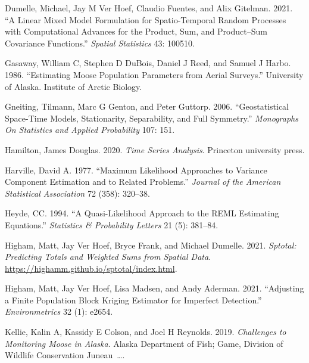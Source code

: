 \documentclass[smallextended]{svjour3}       %
\newlength{\cslhangindent}
\newlength{\cslentryspacingunit} %
\newenvironment{CSLReferences}[2] %
 {%
  \setlength{\parindent}{0pt}
  \ifodd #1
  \let\oldpar\par
  \def\par{\hangindent=\cslhangindent\oldpar}
  \fi
  \setlength{\parskip}{#2\cslentryspacingunit}
 }%
 {}
\begin{document}
\begin{CSLReferences}{1}{0}
\leavevmode{}%
Dumelle, Michael, Jay M Ver Hoef, Claudio Fuentes, and Alix Gitelman.
2021. {``A Linear Mixed Model Formulation for Spatio-Temporal Random
Processes with Computational Advances for the Product, Sum, and
Product--Sum Covariance Functions.''} \emph{Spatial Statistics} 43:
100510.

\leavevmode{}%
Gasaway, William C, Stephen D DuBois, Daniel J Reed, and Samuel J Harbo.
1986. {``Estimating Moose Population Parameters from Aerial Surveys.''}
University of Alaska. Institute of Arctic Biology.

\leavevmode{}%
Gneiting, Tilmann, Marc G Genton, and Peter Guttorp. 2006.
{``Geostatistical Space-Time Models, Stationarity, Separability, and
Full Symmetry.''} \emph{Monographs On Statistics and Applied
Probability} 107: 151.

\leavevmode{}%
Hamilton, James Douglas. 2020. \emph{Time Series Analysis}. Princeton
university press.

\leavevmode{}%
Harville, David A. 1977. {``Maximum Likelihood Approaches to Variance
Component Estimation and to Related Problems.''} \emph{Journal of the
American Statistical Association} 72 (358): 320--38.

\leavevmode{}%
Heyde, CC. 1994. {``A Quasi-Likelihood Approach to the REML Estimating
Equations.''} \emph{Statistics \& Probability Letters} 21 (5): 381--84.

\leavevmode{}%
Higham, Matt, Jay Ver Hoef, Bryce Frank, and Michael Dumelle. 2021.
\emph{Sptotal: Predicting Totals and Weighted Sums from Spatial Data}.
\url{https://highamm.github.io/sptotal/index.html}.

\leavevmode{}%
Higham, Matt, Jay Ver Hoef, Lisa Madsen, and Andy Aderman. 2021.
{``Adjusting a Finite Population Block Kriging Estimator for Imperfect
Detection.''} \emph{Environmetrics} 32 (1): e2654.

\leavevmode{}%
Kellie, Kalin A, Kassidy E Colson, and Joel H Reynolds. 2019.
\emph{Challenges to Monitoring Moose in Alaska}. Alaska Department of
Fish; Game, Division of Wildlife Conservation Juneau~\ldots.


\end{CSLReferences}
\end{document}
